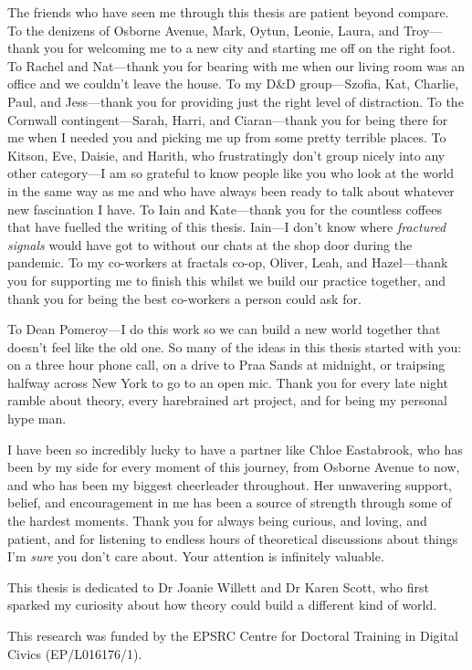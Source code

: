 \begin{acknowledgements}
The friends who have seen me through this thesis are patient beyond compare. To the denizens of Osborne Avenue, Mark, Oytun, Leonie, Laura, and Troy—thank you for welcoming me to a new city and starting me off on the right foot. To Rachel and Nat—thank you for bearing with me when our living room was an office and we couldn't leave the house. To my D\&D group—Szofia, Kat, Charlie, Paul, and Jess—thank you for providing just the right level of distraction. To the Cornwall contingent—Sarah, Harri, and Ciaran—thank you for being there for me when I needed you and picking me up from some pretty terrible places. To Kitson, Eve, Daisie, and Harith, who frustratingly don't group nicely into any other category—I am so grateful to know people like you who look at the world in the same way as me and who have always been ready to talk about whatever new fascination I have. To Iain and Kate—thank you for the countless coffees that have fuelled the writing of this thesis. Iain—I don't know where \textit{fractured signals} would have got to without our chats at the shop door during the pandemic. To my co-workers at fractals co-op, Oliver, Leah,  and Hazel—thank you for supporting me to finish this whilst we build our practice together, and thank you for being the best co-workers a person could ask for.

To Dean Pomeroy—I do this work so we can build a new world together that doesn't feel like the old one. So many of the ideas in this thesis started with you: on a three hour phone call, on a drive to Praa Sands at midnight, or traipsing halfway across New York to go to an open mic. Thank you for every late night ramble about theory, every harebrained art project, and for being my personal hype man.

I have been so incredibly lucky to have a partner like Chloe Eastabrook, who has been by my side for every moment of this journey, from Osborne Avenue to now, and who has been my biggest cheerleader throughout. Her unwavering support, belief, and encouragement in me has been a source of strength through some of the hardest moments. Thank you for always being curious, and loving, and patient, and for listening to endless hours of theoretical discussions about things I'm \textit{sure} you don't care about. Your attention is infinitely valuable. 

This thesis is dedicated to Dr Joanie Willett and Dr Karen Scott, who first sparked my curiosity about how theory could build a different kind of world. 

This research was funded by the EPSRC Centre for Doctoral Training in Digital Civics (EP/L016176/1).
\end{acknowledgements} 
